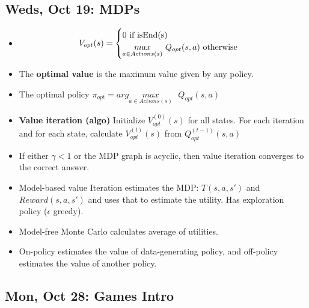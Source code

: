 \documentclass[10pt, oneside]{article}
\begin{document}
\subsection{Weds, Oct 19: MDPs}
\begin{itemize}
\item \[ V_{opt}(s) = \begin{cases} 
      0 \text{ if isEnd(s)}\\
     \underset{a \in Actions(s)}{max}\text{ }Q_{opt}(s,a) \text{ otherwise}
   \end{cases}\\
\]
\item The \textbf{optimal value} is the maximum value given by any policy.

\item The optimal policy $\pi_{opt} = arg \underset{a \in Actions(s)}{max}\text{ }Q_{opt}(s,a)$

\item \textbf{Value iteration (algo)} Initialize $V_{opt}^{(0)}(s)$ for all states. For each iteration and for each state, calculate $V_{opt}^{(t)}(s)$ from $Q_{opt}^{(t-1)}(s,a)$

\item If either $\gamma < 1$ or the MDP graph is acyclic, then value iteration converges to the correct answer. 

\item Model-based value Iteration estimates the MDP: $T(s,a,s')$ and $Reward(s,a,s')$ and uses that to estimate the utility. Has exploration policy ($\epsilon$ greedy).

\item Model-free Monte Carlo calculates average of utilities.

\item On-policy estimates the value of data-generating policy, and off-policy estimates the value of another policy.

\end{itemize}

\subsection{Mon, Oct 28: Games Intro}
\end{document}
